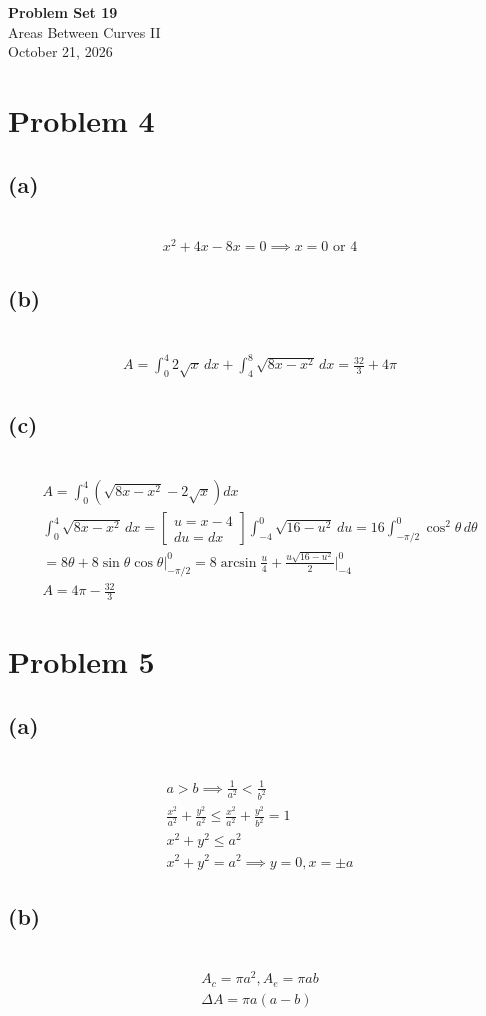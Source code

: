 \documentclass[12pt]{article}
\newcommand{\tor}{\text{ or }}
\newcommand{\problem}[1]{\section{Problem #1}}
\newcommand{\subproblem}[1]{\subsection{(#1)} \,}
\begin{document}
\vspace*{0cm}

\begin{center}
    {\Large \bfseries Problem Set 19} \\[0.5cm]
    {\large Areas Between Curves II} \\[0.35cm]
    {\normalsize October 21, 2026}
\end{center}


\problem{4}

\subproblem{a}
\begin{gather*}
    x^2+4x-8x=0 \implies x= \boxed{0 \tor 4}
\end{gather*}

\subproblem{b}
\begin{gather*}
    A = \int_0^4 2\sqrt{x}\, dx + \int_4^8 \sqrt{8x-x^2}\, dx = \boxed{\frac{32}{3} + 4\pi}
\end{gather*}

\subproblem{c}
\begin{gather*}
    A= \int_0^4 \left(\sqrt{8x-x^2} - 2\sqrt{x}\right) dx \\
    \int_0^4 \sqrt{8x-x^2}\, dx = \begin{bmatrix}
        u=x-4\\
        du=dx
    \end{bmatrix} \int_{-4}^0\sqrt{16-u^2}\, du
    =  16\int_{-\pi/2}^0 \cos^2\theta \, d\theta \\
    =  8\theta + 8\sin\theta\cos\theta \Big|_{-\pi/2}^0
    = 8\arcsin\frac{u}{4}+\frac{u\sqrt{16-u^2}}{2} \Big|_{-4}^{0}\\
    A = \boxed{4\pi - \frac{32}{3}}
\end{gather*}

\problem{5}

\subproblem{a}
\begin{gather*}
    a>b \implies \frac{1}{a^2}<\frac{1}{b^2}\\
    \frac{x^2}{a^2}+\frac{y^2}{a^2} \le \frac{x^2}{a^2}+\frac{y^2}{b^2}=1\\
    \boxed{x^2+y^2\le a^2}\\
    x^2+y^2=a^2 \implies \boxed{y=0,x=\pm a}
\end{gather*}

\subproblem{b}
\begin{gather*}
    A_c =\pi a^2,A_e=\pi ab\\
    \Delta A = \boxed{\pi a(a-b)}
\end{gather*}
\end{document}
